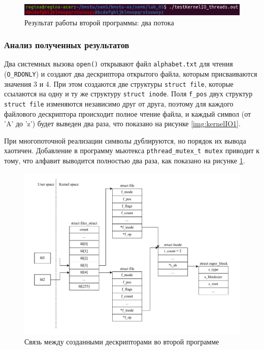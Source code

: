 \begin{figure}[H]
	\begin{center}
		\includegraphics[scale=0.3]{img/kernelIO2.png}
	\end{center}
	\captionsetup{justification=centering}
	\caption{Результат работы второй программы: два потока}
	\label{img:kernelIO2}
\end{figure}

\subsubsection{Анализ полученных результатов}

Два системных вызова \texttt{open()} открывают файл \texttt{alphabet.txt} для чтения (\texttt{O\_RDONLY}) и создают два дескриптора открытого файла, которым присваиваются значения 3 и 4. При этом создаются две структуры \texttt{struct file}, которые ссылаются на одну и ту же структуру \texttt{struct inode}. Поля \texttt{f\_pos} двух структур \texttt{struct file} изменяются независимо друг от друга, поэтому для каждого файлового дескриптора происходит полное чтение файла, и каждый символ (от 'A' до 'z') будет выведен два раза, что показано на рисунке \ref{img:kernelIO1}.

При многопоточной реализации символы дублируются, но порядок их вывода хаотичен. Добавление в программу мьютекса \texttt{pthread\_mutex\_t mutex} приводит к тому, что алфавит выводится полностью два раза, как показано на рисунке \ref{img:kernelIO2}.

\begin{figure}[H]
	\begin{center}
		\includegraphics[scale=0.8]{img/kernelIO.pdf}
	\end{center}
	\captionsetup{justification=centering}
	\caption{Связь между созданными дескрипторами во второй программе}
	\label{img:kernelIO}
\end{figure}

